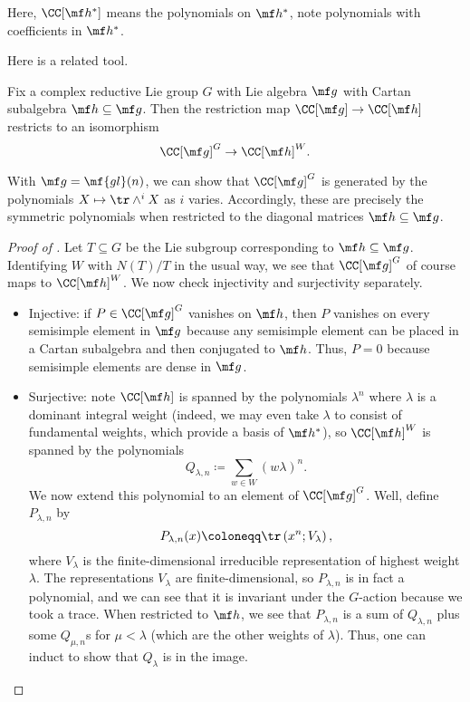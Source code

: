 \documentclass[../notes.tex]{subfiles}
\begin{document}
\begin{remark}
	Here, $\CC[\mf h^*]$ means the polynomials on $\mf h^*$, note polynomials with coefficients in $\mf h^*$.
\end{remark}
Here is a related tool.
\begin{theorem} \label{thm:chev-res}
	Fix a complex reductive Lie group $G$ with Lie algebra $\mf g$ with Cartan subalgebra $\mf h\subseteq\mf g$. Then the restriction map $\CC[\mf g]\to\CC[\mf h]$ restricts to an isomorphism
	\[\CC[\mf g]^G\to\CC[\mf h]^W.\]
\end{theorem}
\begin{example}
	With $\mf g=\mf{gl}(n)$, we can show that $\CC[\mf g]^G$ is generated by the polynomials $X\mapsto\tr\land^iX$ as $i$ varies. Accordingly, these are precisely the symmetric polynomials when restricted to the diagonal matrices $\mf h\subseteq\mf g$.
\end{example}
\begin{proof}[Proof of ]
	Let $T\subseteq G$ be the Lie subgroup corresponding to $\mf h\subseteq\mf g$. Identifying $W$ with $N(T)/T$ in the usual way, we see that $\CC[\mf g]^G$ of course maps to $\CC[\mf h]^W$. We now check injectivity and surjectivity separately.
	\begin{itemize}
		\item Injective: if $P\in\CC[\mf g]^G$ vanishes on $\mf h$, then $P$ vanishes on every semisimple element in $\mf g$ because any semisimple element can be placed in a Cartan subalgebra and then conjugated to $\mf h$. Thus, $P=0$ because semisimple elements are dense in $\mf g$.
		\item Surjective: note $\CC[\mf h]$ is spanned by the polynomials $\lambda^n$ where $\lambda$ is a dominant integral weight (indeed, we may even take $\lambda$ to consist of fundamental weights, which provide a basis of $\mf h^*$), so $\CC[\mf h]^W$ is spanned by the polynomials
		\[Q_{\lambda,n}\coloneqq\sum_{w\in W}(w\lambda)^n.\]
		We now extend this polynomial to an element of $\CC[\mf g]^G$. Well, define $P_{\lambda,n}$ by
		\[P_{\lambda,n}(x)\coloneqq\tr\left(x^n;V_\lambda\right),\]
		where $V_\lambda$ is the finite-dimensional irreducible representation of highest weight $\lambda$. The representations $V_\lambda$ are finite-dimensional, so $P_{\lambda,n}$ is in fact a polynomial, and we can see that it is invariant under the $G$-action because we took a trace. When restricted to $\mf h$, we see that $P_{\lambda,n}$ is a sum of $Q_{\lambda,n}$ plus some $Q_{\mu,n}$s for $\mu<\lambda$ (which are the other weights of $\lambda$). Thus, one can induct to show that $Q_\lambda$ is in the image.
		\qedhere
	\end{itemize}
\end{proof}
\end{document}
